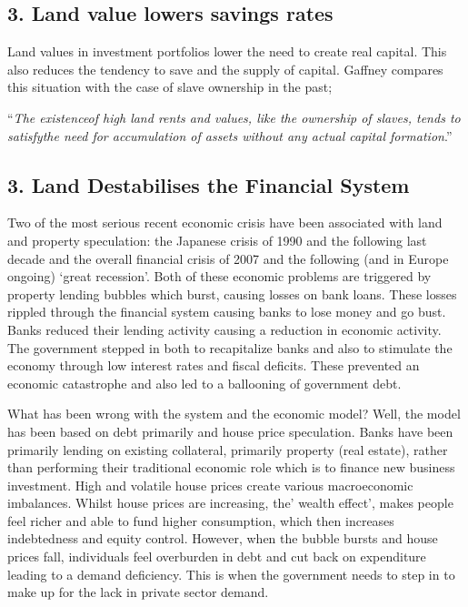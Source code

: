 \documentclass[]{tufte-handout}
\begin{document}
\hypertarget{land-value-lowers-savings-rates}{%
\subsection{3. Land value lowers savings
rates}\label{land-value-lowers-savings-rates}}

Land values in investment portfolios lower the need to create real
capital. This also reduces the tendency to save and the supply of
capital. Gaffney compares this situation with the case of slave
ownership in the past;

``\emph{The existenceof high land rents and values, like the ownership
of slaves, tends to satisfythe need for accumulation of assets without
any actual capital formation}.''

\hypertarget{land-destabilises-the-financial-system}{%
\subsection{3. Land Destabilises the Financial
System}\label{land-destabilises-the-financial-system}}

Two of the most serious recent economic crisis have been associated with
land and property speculation: the Japanese crisis of 1990 and the
following last decade and the overall financial crisis of 2007 and the
following (and in Europe ongoing) `great recession'. Both of these
economic problems are triggered by property lending bubbles which burst,
causing losses on bank loans. These losses rippled through the financial
system causing banks to lose money and go bust. Banks reduced their
lending activity causing a reduction in economic activity. The
government stepped in both to recapitalize banks and also to stimulate
the economy through low interest rates and fiscal deficits. These
prevented an economic catastrophe and also led to a ballooning of
government debt.

What has been wrong with the system and the economic model? Well, the
model has been based on debt primarily and house price speculation.
Banks have been primarily lending on existing collateral, primarily
property (real estate), rather than performing their traditional
economic role which is to finance new business investment. High and
volatile house prices create various macroeconomic imbalances. Whilst
house prices are increasing, the' wealth effect', makes people feel
richer and able to fund higher consumption, which then increases
indebtedness and equity control. However, when the bubble bursts and
house prices fall, individuals feel overburden in debt and cut back on
expenditure leading to a demand deficiency. This is when the government
needs to step in to make up for the lack in private sector demand.
\end{document}
